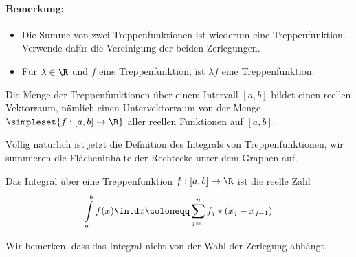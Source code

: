 \paragraph{Bemerkung:}
\begin{itemize}
	\item Die Summe von zwei Treppenfunktionen ist wiederum eine Treppenfunktion. Verwende dafür die Vereinigung der beiden Zerlegungen.
	\item Für $\lambda\in\R$ und $f$ eine Treppenfunktion, ist $\lambda f$ eine Treppenfunktion.
\end{itemize}
\begin{lemma}{}
	Die Menge der Treppenfunktionen über einem Intervall $[a,b]$ bildet einen reellen Vektorraum, nämlich einen Untervektorraum von der Menge $\simpleset{f:[a,b]\rightarrow \R}$ aller reellen Funktionen auf $[a,b]$.
\end{lemma}

Völlig natürlich ist jetzt die Definition des Integrals von Treppenfunktionen, wir summieren die Flächeninhalte der Rechtecke unter dem Graphen auf.
\begin{definition}{}
	Das Integral über eine Treppenfunktion $f:[a,b]\rightarrow \R$ ist die reelle Zahl
	\begin{equation*}
		\int\limits_a^bf(x)\intd x\coloneqq \sum\limits_{j=1}^n f_j*(x_j-x_{j-1})
	\end{equation*}
\end{definition}
Wir bemerken, dass das Integral nicht von der Wahl der Zerlegung abhängt.

